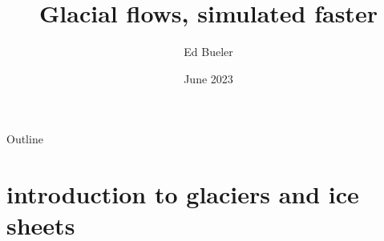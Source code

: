 \documentclass[svgnames,
               hyperref={colorlinks,citecolor=DeepPink4,linkcolor=FireBrick,urlcolor=Maroon},
               usepdftitle=false]  %
               {beamer}
\title{Glacial flows, simulated faster}
\author{Ed Bueler}
\institute[UAF]{University of Alaska Fairbanks}
\date[]{June 2023}
\begin{document}
\beamertemplatenavigationsymbolsempty


{
  \begin{frame}
    \titlepage
  \end{frame}
}

\begin{frame}{Outline}
  \tableofcontents[hideallsubsections]
\end{frame}


\section{introduction to glaciers and ice sheets}
\end{document}
